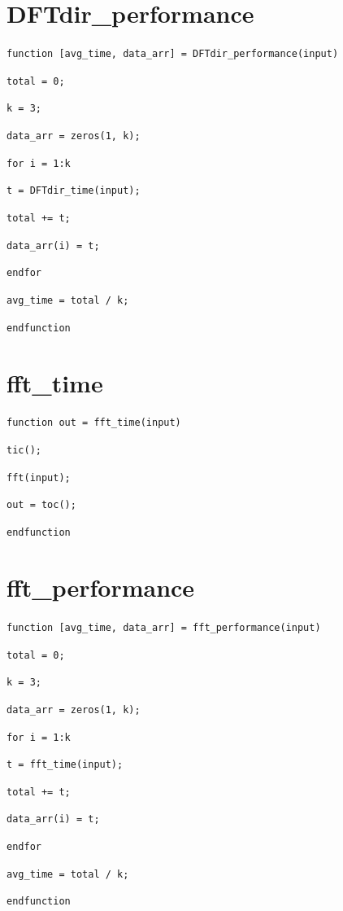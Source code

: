 \documentclass[a4paper, 12pt]{report}
\begin{document}
		\newpage
		\section{DFTdir\_performance} %
		\label{sec:dftdir_performance_code}
			\texttt{function [avg\_time, data\_arr] = DFTdir\_performance(input)}\par
			\texttt{total = 0;}\par
			\texttt{k = 3;}\par
			\texttt{data\_arr = zeros(1, k);}\par
			\texttt{for i = 1:k}\par
			\hspace*{2em}\texttt{t = DFTdir\_time(input);}\par
			\hspace*{2em}\texttt{total += t;}\par
			\texttt{data\_arr(i) = t;}\par
			\texttt{endfor}\par
			\texttt{avg\_time = total / k;}\par
			\noindent\texttt{endfunction}

		\section{fft\_time} %
		\label{sec:fft_time}
			\texttt{function out = fft\_time(input)}\par{}
			\texttt{tic();}\par
			\texttt{fft(input);}\par
			\texttt{out = toc();}\par
			\texttt{endfunction}\par

		\section{fft\_performance} %
		\label{sec:fft_performance}
			\texttt{function [avg\_time, data\_arr] = fft\_performance(input)}\par
			\texttt{total = 0;}\par
			\texttt{k = 3;}\par
			\texttt{data\_arr = zeros(1, k);}\par
			\texttt{for i = 1:k}\par
			\hspace*{2em}\texttt{t = fft\_time(input);}\par
			\hspace*{2em}\texttt{total += t;}\par
			\texttt{data\_arr(i) = t;}\par
			\texttt{endfor}\par
			\texttt{avg\_time = total / k;}\par
			\noindent\texttt{endfunction}
\end{document}
